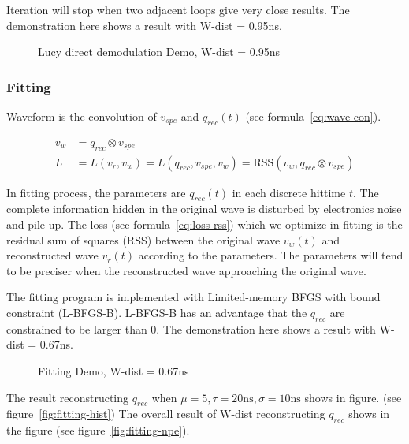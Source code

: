 Iteration will stop when two adjacent loops give very close results. The demonstration here shows a result with W-dist = 0.95ns. 

\begin{figure}[H]
    \centering
    \scalebox{0.4}{}
    \caption{Lucy direct demodulation Demo, W-dist = 0.95ns}
\end{figure}

\subsubsection{Fitting}

Waveform is the convolution of $v_{spe}$ and $q_{rec}(t)$ (see formula~\eqref{eq:wave-con}). 

\begin{align}
    v_{w} &= q_{rec} \otimes v_{spe} \label{eq:wave-con} \\
    L &= L(v_{r}, v_{w}) = L(q_{rec}, v_{spe}, v_{w}) = \mathrm{RSS}(v_{w}, q_{rec} \otimes v_{spe}) \label{eq:loss-rss}
\end{align}

In fitting process, the parameters are $q_{rec}(t)$ in each discrete hittime $t$. The complete information hidden in the original wave is disturbed by electronics noise and pile-up. The loss (see formula~\ref{eq:loss-rss}) which we optimize in fitting is the residual sum of squares (RSS) between the original wave $v_{w}(t)$ and reconstructed wave $v_{r}(t)$ according to the parameters. The parameters will tend to be preciser when the reconstructed wave approaching the original wave. 

The fitting program is implemented with Limited-memory BFGS with bound constraint \cite{byrd_limited_1995} (L-BFGS-B). L-BFGS-B has an advantage that the $q_{rec}$ are constrained to be larger than 0. The demonstration here shows a result with W-dist = 0.67ns. 

\begin{figure}[H]
    \centering
    \scalebox{0.4}{}
    \caption{Fitting Demo, W-dist = 0.67ns}
\end{figure}

The result reconstructing $q_{rec}$ when $\mu=5, \tau=20\mathrm{ns}, \sigma=10\mathrm{ns}$ shows in figure. (see figure~\ref{fig:fitting-hist}) The overall result of W-dist reconstructing $q_{rec}$ shows in the figure (see figure~\ref{fig:fitting-npe}). 

